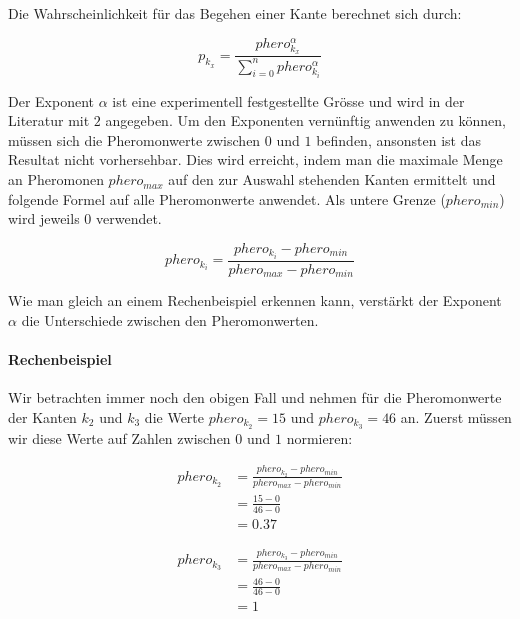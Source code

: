 Die Wahrscheinlichkeit für das Begehen einer Kante berechnet sich durch:

\[ p_{k_x} = \frac{phero_{k_x}^\alpha}{\sum\nolimits_{i=0}^n phero_{k_i}^\alpha} \]

\noindent
Der Exponent $\alpha$ ist eine experimentell festgestellte Grösse und wird in der Literatur mit $2$ angegeben. Um den Exponenten vernünftig anwenden zu können, müssen sich die Pheromonwerte zwischen $0$ und $1$ befinden, ansonsten ist das Resultat nicht vorhersehbar. Dies wird erreicht, indem man die maximale Menge an Pheromonen $phero_{max}$ auf den zur Auswahl stehenden Kanten ermittelt und folgende Formel auf alle Pheromonwerte anwendet. Als untere Grenze ($phero_{min}$) wird jeweils $0$ verwendet.

\[ phero_{k_i} = \frac{phero_{k_i} - phero_{min}}{phero_{max} - phero_{min}} \] 

\noindent
Wie man gleich an einem Rechenbeispiel erkennen kann, verstärkt der Exponent $\alpha$ die Unterschiede zwischen den Pheromonwerten.



\paragraph*{Rechenbeispiel}

Wir betrachten immer noch den obigen Fall und nehmen für die Pheromonwerte der Kanten $k_2$ und $k_3$ die Werte $phero_{k_2} = 15 $ und $phero_{k_3} = 46$ an. Zuerst müssen wir diese Werte auf Zahlen zwischen $0$ und $1$ normieren:

\begin{equation*}
\begin{split}
phero_{k_2} & = \frac{phero_{k_2} - phero_{min}}{phero_{max} - phero_{min}} \\
            & = \frac{15 - 0}{46 - 0} \\
            & = 0.37
\end{split}
\end{equation*}

\begin{equation*}
\begin{split}
phero_{k_3} & = \frac{phero_{k_3} - phero_{min}}{phero_{max} - phero_{min}} \\
            & = \frac{46 - 0}{46 - 0} \\
            & = 1
\end{split}
\end{equation*}

